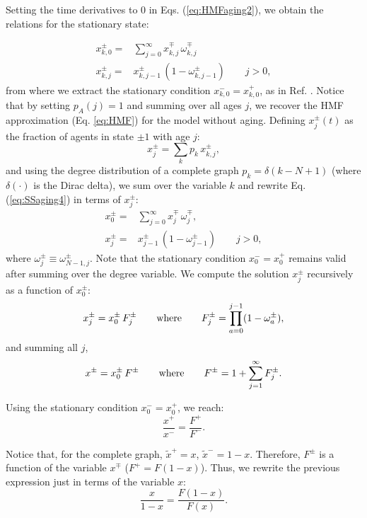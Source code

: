 
Setting the time derivatives to 0 in Eqs. (\ref{eq:HMFaging2}), we obtain the relations for the stationary state:

\begin{eqnarray}
     x^{\pm}_{k,0} = & \sum_{j=0}^{\infty} x^{\mp}_{k,j} \,  \omega_{k,j}^{\mp} \nonumber \\
     x^{\pm}_{k,j} = & x^{\pm}_{k,j-1} \, ( 1 - \omega_{k,j-1}^{\pm})  \qquad j > 0, \label{eq:SSaging4}
\end{eqnarray}
from where we extract the stationary condition $x^{-}_{k,0} = x^{+}_{k,0}$, as in Ref. \cite{chen-2020}. Notice that by setting $p_A(j) = 1$ and summing over all ages $j$, we recover the HMF approximation (Eq. \ref{eq:HMF}) for the model without aging. Defining $x^{\pm}_{j}(t)$ as the fraction of agents in state $\pm 1$ with age $j$:
\begin{equation}
    x^{\pm}_{j} = \sum_k p_k \, x^{\pm}_{k,j},
\end{equation}
and using the degree distribution of a complete graph $p_k = \delta(k-N+1)$ (where $\delta(\cdot)$ is the Dirac delta), we sum over the variable $k$ and rewrite Eq. (\ref{eq:SSaging4}) in terms of $x^{\pm}_{j}$:
\begin{eqnarray}
     x^{\pm}_{0} = & \sum_{j=0}^{\infty} x^{\mp}_{j} \, \omega_{j}^{\mp}, \nonumber \\
     x^{\pm}_{j} = & x^{\pm}_{j-1} \, ( 1 - \omega_{j-1}^{\pm})  \qquad j > 0,   \label{eq:SSSaging2}
\end{eqnarray}
where $\omega_{j}^{\pm} \equiv \omega_{N-1,j}^{\pm}$. Note that the stationary condition $x^{-}_{0} = x^{+}_{0}$ remains valid after summing over the degree variable. We compute the solution $x^{\pm}_{j}$ recursively as a function of $x^{\pm}_0$:
\begin{equation}
    x^{\pm}_{j} = x^{\pm}_0 \, F_j^{\pm} \qquad {\rm where} \qquad F_j^{\pm} = \prod_{a = 0}^{j-1} (1 - \omega_a^{\pm}),
\end{equation}
and summing all $j$,
\begin{equation}
    x^{\pm} = x^{\pm}_0 \, F^{\pm}  \qquad {\rm where} \qquad F^{\pm} = 1 + \sum_{j=1}^{\infty} F_j^{\pm}.
\end{equation}

Using the stationary condition $x^{-}_0 = x^{+}_0$, we reach:
\begin{equation}
    \frac{x^{+}}{x^{-}} = \frac{F^{+}}{F^{-}}.
\end{equation}

Notice that, for the complete graph, $\tilde{x}^{+} = x$, $\tilde{x}^{-} = 1 - x$. Therefore, $F^{\pm}$ is a function of the variable $x^{\mp}$ ($F^{+} = F(1 - x)$). Thus, we rewrite the previous expression just in terms of the variable $x$:
\begin{equation}
    \frac{x}{1- x} = \frac{F(1 - x)}{F(x)}.
\end{equation}